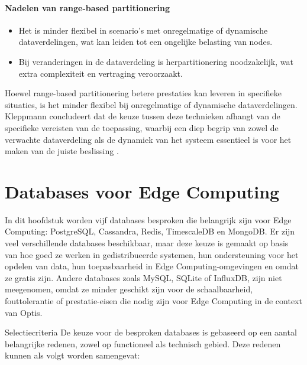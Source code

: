 \paragraph{Nadelen van range-based partitionering}  
\begin{itemize}
    \item Het is minder flexibel in scenario's met onregelmatige of dynamische dataverdelingen, wat kan leiden tot een ongelijke belasting van nodes.  
    \item Bij veranderingen in de dataverdeling is herpartitionering noodzakelijk, wat extra complexiteit en vertraging veroorzaakt.  
\end{itemize}
 
Hoewel range-based partitionering betere prestaties kan leveren in specifieke situaties, is het minder flexibel bij onregelmatige of dynamische dataverdelingen. Kleppmann concludeert dat de keuze tussen deze technieken afhangt van de specifieke vereisten van de toepassing, waarbij een diep begrip van zowel de verwachte dataverdeling als de dynamiek van het systeem essentieel is voor het maken van de juiste beslissing \autocite{Kleppmann2017}.

\section{Databases voor Edge Computing}

In dit hoofdstuk worden vijf databases besproken die belangrijk zijn voor Edge Computing: PostgreSQL, Cassandra, Redis, TimescaleDB en MongoDB. Er zijn veel verschillende databases beschikbaar, maar deze keuze is gemaakt op basis van hoe goed ze werken in gedistribueerde systemen, hun ondersteuning voor het opdelen van data, hun toepasbaarheid in Edge Computing-omgevingen en omdat ze gratis zijn. Andere databases zoals MySQL, SQLite of InfluxDB, zijn niet meegenomen, omdat ze minder geschikt zijn voor de schaalbaarheid, fouttolerantie of prestatie-eisen die nodig zijn voor Edge Computing in de context van Optis.

Selectiecriteria
De keuze voor de besproken databases is gebaseerd op een aantal belangrijke redenen, zowel op functioneel als technisch gebied. Deze redenen kunnen als volgt worden samengevat:


